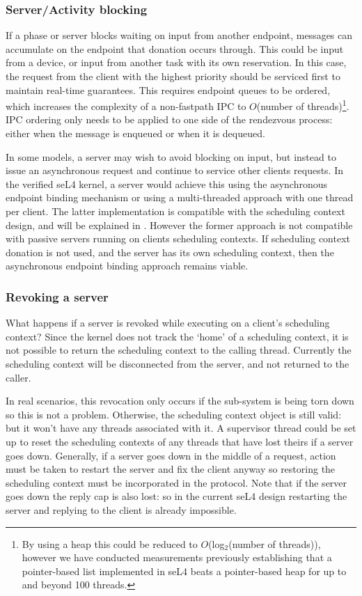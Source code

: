 \subsubsection{Server/Activity blocking}

If a phase or server blocks waiting on input from another endpoint, messages can accumulate on the endpoint that donation occurs through.
This could be input from a device, or input from another task with its own reservation.
In this case, the request from the client with the highest priority should be serviced first to maintain real-time guarantees.
This requires endpoint queues to be ordered, which increases the complexity of a non-fastpath IPC to $O$(number of threads)\footnote{By using a heap this could be reduced to $O$(log$_{2}$(number of threads)), however we have conducted measurements previously establishing that a pointer-based list implemented in seL4 beats a pointer-based heap for up to and beyond 100 threads.}.
IPC ordering only needs to be applied to one side of the rendezvous process: either when the message is enqueued or when it is dequeued.

In some models, a server may wish to avoid blocking on input, but instead to issue an asynchronous request and continue to service other clients requests.
In the verified seL4 kernel, a server would achieve this using the asynchronous endpoint binding mechanism or using a multi-threaded approach with one thread per client.
The latter implementation is compatible with the scheduling context design, and will be explained in .
However the former approach is not compatible with passive servers running on clients scheduling contexts.
If scheduling context donation is not used, and the server has its own scheduling context, then the asynchronous endpoint binding approach remains viable.

\subsubsection{Revoking a server}

What happens if a server is revoked while executing on a client's scheduling context?
Since the kernel does not track the `home' of a scheduling context, it is not possible to return the scheduling context to the calling thread.
Currently the scheduling context will be disconnected from the server, and not returned to the caller.

In real scenarios, this revocation only occurs if the sub-system is being torn down so this is not a problem.
Otherwise, the scheduling context object is still valid: but it won't have any threads associated with it.
A supervisor thread could be set up to reset the scheduling contexts of any threads that have lost theirs if a server goes down.
Generally, if a server goes down in the middle of a request, action must be taken to restart the server and fix the client anyway so restoring the scheduling context must be incorporated in the protocol.
Note that if the server goes down the reply cap is also lost: so in the current seL4 design restarting the server and replying to the client is already impossible.


